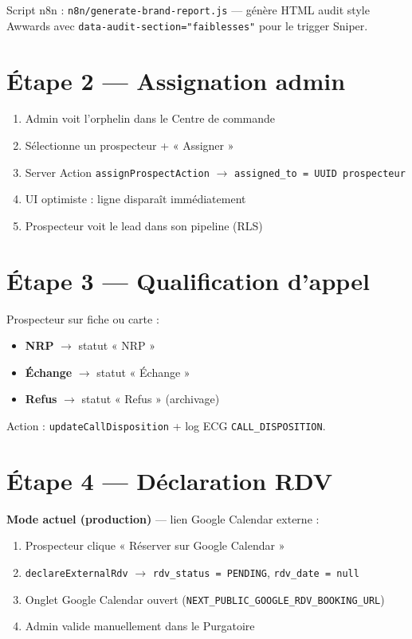 \documentclass[11pt,a4paper]{report}
\begin{document}
Script n8n : \texttt{n8n/generate-brand-report.js} --- génère HTML audit style Awwards avec \texttt{data-audit-section="faiblesses"} pour le trigger Sniper.

\section{Étape 2 --- Assignation admin}

\begin{enumerate}
  \item Admin voit l'orphelin dans le Centre de commande
  \item Sélectionne un prospecteur + « Assigner »
  \item Server Action \texttt{assignProspectAction} $\rightarrow$ \texttt{assigned\_to = UUID prospecteur}
  \item UI optimiste : ligne disparaît immédiatement
  \item Prospecteur voit le lead dans son pipeline (RLS)
\end{enumerate}

\section{Étape 3 --- Qualification d'appel}

Prospecteur sur fiche ou carte :
\begin{itemize}[noitemsep]
  \item \textbf{NRP} $\rightarrow$ statut « NRP »
  \item \textbf{Échange} $\rightarrow$ statut « Échange »
  \item \textbf{Refus} $\rightarrow$ statut « Refus » (archivage)
\end{itemize}
Action : \texttt{updateCallDisposition} + log ECG \texttt{CALL\_DISPOSITION}.

\section{Étape 4 --- Déclaration RDV}

\textbf{Mode actuel (production)} --- lien Google Calendar externe :
\begin{enumerate}
  \item Prospecteur clique « Réserver sur Google Calendar »
  \item \texttt{declareExternalRdv} $\rightarrow$ \texttt{rdv\_status = PENDING}, \texttt{rdv\_date = null}
  \item Onglet Google Calendar ouvert (\texttt{NEXT\_PUBLIC\_GOOGLE\_RDV\_BOOKING\_URL})
  \item Admin valide manuellement dans le Purgatoire
\end{enumerate}
\end{document}
